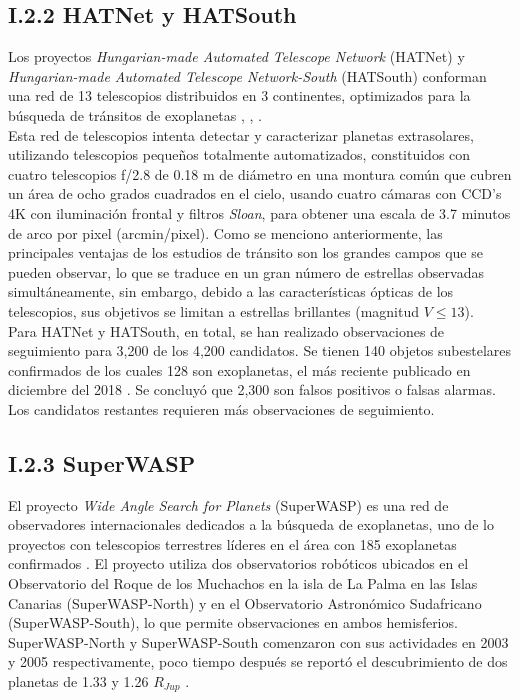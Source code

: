 \subsection*{I.2.2 HATNet y HATSouth}

Los proyectos \textit{Hungarian-made Automated Telescope Network} (HATNet) y \textit{Hungarian-made Automated Telescope Network-South} (HATSouth) conforman una red de 13 telescopios distribuidos en 3 continentes, optimizados para la búsqueda de tránsitos de exoplanetas \cite{bakos2002system}, \cite{bakos2004wide}, \cite{bakos2013hatsouth}. \\

Esta red de telescopios intenta detectar y caracterizar planetas extrasolares, utilizando telescopios pequeños totalmente automatizados, constituidos con cuatro telescopios f/2.8 de 0.18 m de diámetro en una montura común que cubren un área de ocho grados cuadrados en el cielo, usando cuatro cámaras con CCD's 4K con iluminación frontal y filtros \textit{Sloan}, para obtener una escala de 3.7 minutos de arco por pixel (arcmin/pixel). Como se menciono anteriormente, las principales ventajas de los estudios de tránsito son los grandes campos que se pueden observar, lo que se traduce en un gran número de estrellas observadas simultáneamente, sin embargo, debido a las características ópticas de los telescopios, sus objetivos se limitan a estrellas brillantes (magnitud $V \leq 13$).\\

Para HATNet y HATSouth, en total, se han realizado observaciones de seguimiento para 3,200 de los 4,200 candidatos. Se tienen 140 objetos subestelares confirmados de los cuales 128 son exoplanetas, el más reciente publicado en diciembre del 2018 \cite{bakos2018hats}. Se concluyó que 2,300 son falsos positivos o falsas alarmas. Los candidatos restantes requieren más observaciones de seguimiento.\\

\subsection*{I.2.3 SuperWASP}

El proyecto \textit{Wide Angle Search for Planets} (SuperWASP) es una red de observadores internacionales dedicados a la búsqueda de exoplanetas, uno de lo proyectos con telescopios terrestres líderes en el área con 185 exoplanetas confirmados \cite{pollacco2006wasp}. El proyecto utiliza dos observatorios robóticos ubicados en el Observatorio del Roque de los Muchachos en la isla de La Palma en las Islas Canarias (SuperWASP-North) y en el Observatorio Astronómico Sudafricano (SuperWASP-South), lo que permite observaciones en ambos hemisferios. SuperWASP-North y SuperWASP-South comenzaron con sus actividades en 2003 y 2005 respectivamente, poco tiempo después se reportó el descubrimiento de dos planetas de 1.33 y 1.26 $R_{Jup}$ \cite{cameron2007wasp}.\\


